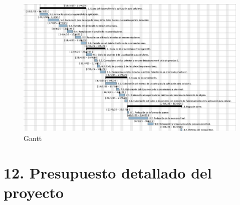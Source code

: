\documentclass[
11pt, %
]{charter}
\begin{document}
\begin{landscape}
\begin{figure}[H]
\centering 
\includegraphics[width=1.5\textwidth]{./Gantt2.png}
\caption{Gantt}
\label{fig:AoN}
\end{figure}
\end{landscape}


\section{12. Presupuesto detallado del proyecto}
\label{sec:presupuesto}
\end{document}
